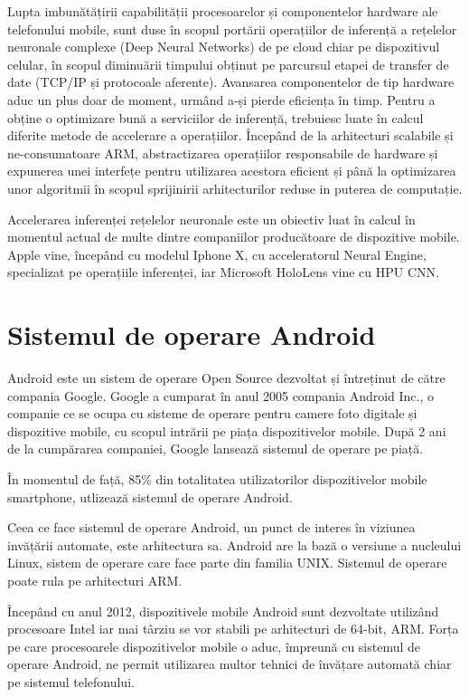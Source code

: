 	Lupta imbunătățirii capabilității procesoarelor și componentelor hardware ale telefonului mobile, sunt duse în scopul portării operațiilor de inferență a rețelelor neuronale complexe (Deep Neural Networks) de pe cloud chiar pe dispozitivul celular, în scopul diminuării timpului obținut pe parcursul etapei de transfer de date (TCP/IP și protocoale aferente). Avansarea componentelor de tip hardware aduc un plus doar de moment, urmând a-și pierde eficiența în timp. Pentru a obține o optimizare bună a serviciilor de inferență, trebuiesc luate în calcul diferite metode de accelerare a operațiilor. Începând de la arhitecturi scalabile și ne-consumatoare ARM, abstractizarea operațiilor responsabile de hardware și expunerea unei interfețe pentru utilizarea acestora eficient și până la optimizarea unor algoritmii în scopul sprijinirii arhitecturilor reduse in puterea de computație.
	
	Accelerarea inferenței rețelelor neuronale este un obiectiv luat în calcul în momentul actual de multe dintre companiilor producătoare de dispozitive mobile. Apple vine, începând cu modelul Iphone X, cu acceleratorul Neural Engine, specializat pe operațiile inferenței, iar Microsoft HoloLens vine cu HPU CNN. \cite{arm_ml}
	
	\section{Sistemul de operare Android}
	
	Android este un sistem de operare Open Source dezvoltat și întreținut de către compania Google. Google a cumparat în anul 2005 compania Android Inc., o companie ce se ocupa cu sisteme de operare pentru camere foto digitale și dispozitive mobile, cu scopul intrării pe piața dispozitivelor mobile. După 2 ani de la cumpărarea companiei, Google lansează sistemul de operare pe piață. 
	
	În momentul de față, 85\% din totalitatea utilizatorilor dispozitivelor mobile smartphone, utlizează sistemul de operare Android. 
	
	Ceea ce face sistemul de operare Android, un punct de interes în viziunea invățării automate, este arhitectura sa. Android are la bază o versiune a nucleului Linux, sistem de operare care face parte din familia UNIX. Sistemul de operare poate rula pe arhitecturi ARM. 
	
	Începând cu anul 2012, dispozitivele mobile Android sunt dezvoltate utilizând procesoare Intel iar mai târziu se vor stabili pe arhitecturi de 64-bit, ARM. 
	Forța pe care procesoarele dispozitivelor mobile o aduc, împreună cu sistemul de operare Android, ne permit utilizarea multor tehnici de învățare automată chiar pe sistemul telefonului. 
	
